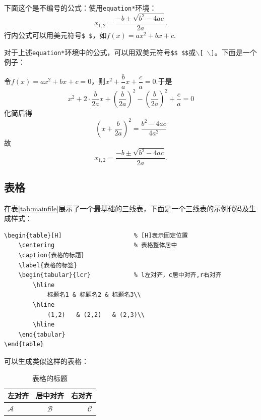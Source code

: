         下面这个是不编号的公式：使用\texttt{equation*}环境：
        \begin{equation*}
        x_{1,2}=\frac{{-b \pm \sqrt{{b^2}-4ac}}}{{2a}}.
        \end{equation*}
        行内公式可以用美元符号\texttt{\$ \$}，如$f(x)=ax^2+bx+c$.

        对于上述\texttt{equation*}环境中的公式，可以用双美元符号\texttt{\$\$ \quad{}\$\$}或\texttt{$\backslash$[ \quad{}$\backslash$]}。下面是一个例子：
    
    令$f(x)=ax^2+bx+c=0$，则$x^2+\dfrac{b}{a}x+\dfrac{c}{a}=0$.于是
    \[x^2+2\cdot \frac{b}{2a}x+(\frac{b}{2a})^2-(\frac{b}{2a})^2+\frac{c}{a}=0\]
    化简后得
    $$(x+\frac{b}{2a})^2=\frac{b^2-4ac}{4a^2}$$故
    \begin{equation}\label{eq:quadratic}
        x_{1,2}=\frac{{-b \pm \sqrt{{b^2}-4ac}}}{{2a}}.
    \end{equation}

    \subsection{表格}\label{subsec:tab}
        在表\ref{tab:mainfile}展示了一个最基础的三线表，下面是一个三线表的示例代码及生成样式：

        \begin{lstlisting}[caption=三线表\LaTeX{}代码示例,label=code:tab]
\begin{table}[H]                    % [H]表示固定位置
    \centering                      % 表格整体居中
    \caption{表格的标题}
    \label{表格的标签}
    \begin{tabular}{lcr}            % l左对齐，c居中对齐,r右对齐
        \hline 
            标题名1 & 标题名2 & 标题名3\\ 
        \hline 
            (1,2)   & (2,2)   & (2,3)\\
        \hline                     
    \end{tabular}
\end{table}
        \end{lstlisting}

        可以生成类似这样的表格：
        \begin{table}[H]
            \centering
            \caption{表格的标题}
            \label{表格的标签}
            \begin{tabular}{lcr}
                \hline 
                    左对齐 & 居中对齐 & 右对齐\\ 
                \hline 
                    $\mathcal{A}$  & $\mathcal{B}$ & $\mathcal{C}$\\
                \hline 
            \end{tabular}
        \end{table}

